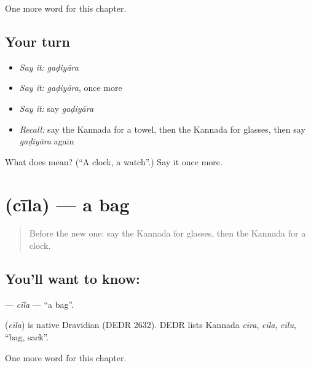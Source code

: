 \begin{grammarlens}[title={What you've built}]
One more word for this chapter.
\end{grammarlens}

\subsection*{Your turn}
\begin{itemize}
\raggedright
  \item \emph{Say it:} \emph{gaḍiyāra}
  \item \emph{Say it:} \emph{gaḍiyāra}, once more
  \item \emph{Say it:} say \emph{gaḍiyāra}
  \item \emph{Recall:} say the Kannada for a towel, then the Kannada for glasses, then say \emph{gaḍiyāra} again
\end{itemize}

\begin{tcolorbox}[breakable,colback=teal!4,colframe=teal!35!black,title={Before you move on}]
What does  mean? (\textquotedblleft{}A clock, a watch\textquotedblright{}.) Say it once more.
\end{tcolorbox}
\section[\texorpdfstring{\kn{ಚೀಲ} (cīla)}{ಚೀಲ (cīla)}]{ (cīla) — a bag}

\label{lesson:KA-C118-cila}



\begin{quote}
Before the new one: say the Kannada for glasses, then the Kannada for a clock.
\end{quote}

\subsection*{You'll want to know: }
\textbf{} — \emph{cīla} — \textquotedblleft{}a bag\textquotedblright{}.

\begin{cousinweb}
\textbf{} (\emph{cīla}) is native Dravidian (DEDR 2632). DEDR lists Kannada \emph{cīra}, \emph{cīla}, \emph{cīlu}, \textquotedblleft{}bag, sack\textquotedblright{}.
\end{cousinweb}

\begin{grammarlens}[title={What you've built}]
One more word for this chapter.
\end{grammarlens}

